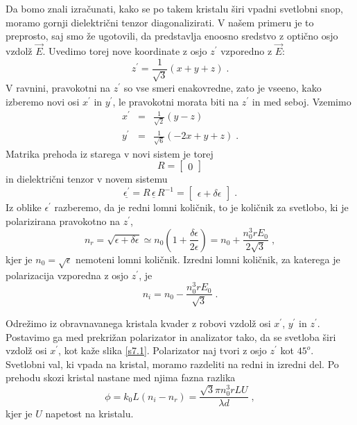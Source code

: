 \documentclass[11pt,fleqn]{book} %
\begin{document}
Da bomo znali izračunati, kako se po takem kristalu širi vpadni svetlobni
snop, moramo gornji dielektrični tenzor diagonalizirati. V našem primeru
je to preprosto, saj smo že ugotovili, da predstavlja enoosno sredstvo
z optično osjo vzdolž $\vec{E}$. Uvedimo torej nove koordinate z
osjo $z^{\prime}$ vzporedno z $\vec{E}$: 
\begin{equation}
z^{\prime}=\frac{1}{\sqrt{3}}(x+y+z)\;.\label{7.9}
\end{equation}
 V ravnini, pravokotni na $z^{\prime}$ so vse smeri enakovredne,
zato je vseeno, kako izberemo novi osi $x^{\prime}$ in $y^{\prime}$,
le pravokotni morata biti na $z^{\prime}$ in med seboj. Vzemimo 
\begin{eqnarray}
x^{\prime} & = & \frac{1}{\sqrt{2}}(y-z)\nonumber \\
y^{\prime} & = & \frac{1}{\sqrt{6}}(-2x+y+z)\;.
\end{eqnarray}
 Matrika prehoda iz starega v novi sistem je torej 
\begin{equation}
R=\left[\begin{matrix}0\end{matrix}\right]\label{7.11}
\end{equation}
 in dielektrični tenzor v novem sistemu 
\begin{equation}
\underline{\epsilon^{\prime}}=R\,\underline{\epsilon}\, R^{-1}=\left[\begin{matrix}\epsilon+\delta\epsilon\end{matrix}\right]\;.\label{7.12}
\end{equation}
 Iz oblike $\epsilon^{\prime}$ razberemo, da je redni lomni količnik,
to je količnik za svetlobo, ki je polarizirana pravokotno na $z^{\prime}$,
\begin{equation}
n_{r}=\sqrt{\epsilon+\delta\epsilon}\simeq n_{0}(1+\frac{\delta\epsilon}{2\epsilon})=n_{0}+\frac{n_{0}^{3}rE_{0}}{2\sqrt{3}}\;,\label{7.13}
\end{equation}
 kjer je $n_{0}=\sqrt{\epsilon}$ nemoteni lomni količnik. Izredni
lomni količnik, za katerega je polarizacija vzporedna z osjo $z^{\prime}$,
je 
\begin{equation}
n_{i}=n_{0}-\frac{n_{0}^{3}rE_{0}}{\sqrt{3}}\;.\label{7.14}
\end{equation}


Odrežimo iz obravnavanega kristala kvader z robovi vzdolž osi $x^{\prime}$,
$y^{\prime}$ in $z^{\prime}$. Postavimo ga med prekrižan polarizator
in analizator tako, da se svetloba širi vzdolž osi $x^{\prime}$,
kot kaže slika \ref{s7.1}. Polarizator naj tvori z osjo $z^{\prime}$
kot $45^{o}$. Svetlobni val, ki vpada na kristal, moramo razdeliti
na redni in izredni del. Po prehodu skozi kristal nastane med njima
fazna razlika 
\begin{equation}
\phi=k_{0}L(n_{i}-n_{r})=\frac{\sqrt{3}\pi n_{0}^{3}rLU}{\lambda d}\;,\label{7.15}
\end{equation}
 kjer je $U$ napetost na kristalu.
\end{document}
